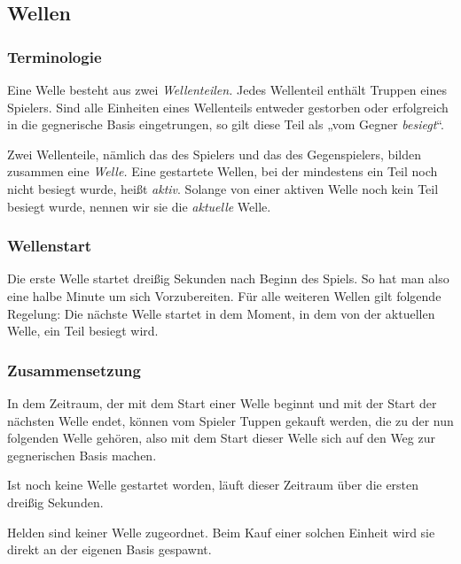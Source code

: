 \subsection{Wellen}

\subsubsection{Terminologie}

Eine Welle besteht aus zwei \emph{Wellenteilen.} Jedes Wellenteil enthält
Truppen eines Spielers.  Sind alle Einheiten eines Wellenteils entweder
gestorben oder erfolgreich in die gegnerische Basis eingetrungen, so gilt diese Teil als „vom Gegner \emph{besiegt}“.

Zwei Wellenteile, nämlich das des Spielers und das des Gegenspielers, bilden
zusammen eine \emph{Welle.} Eine gestartete Wellen, bei der mindestens ein Teil
noch nicht besiegt wurde, heißt \emph{aktiv}.
Solange von einer aktiven Welle noch kein Teil besiegt wurde, nennen wir sie die \emph{aktuelle} Welle.


\subsubsection{Wellenstart}

Die erste Welle startet dreißig Sekunden nach Beginn des Spiels. So hat man also eine halbe Minute um sich Vorzubereiten.
Für alle weiteren Wellen gilt folgende Regelung: Die nächste Welle startet in dem Moment, in dem von der aktuellen Welle, ein Teil besiegt wird.


\subsubsection{Zusammensetzung}

In dem Zeitraum, der mit dem Start einer Welle beginnt und mit der Start der
nächsten Welle endet, können vom Spieler Tuppen gekauft werden, die zu der nun
folgenden Welle gehören, also mit dem Start dieser Welle sich auf den Weg zur
gegnerischen Basis machen.

Ist noch keine Welle gestartet worden, läuft dieser Zeitraum über die ersten
dreißig Sekunden.

Helden sind keiner Welle zugeordnet. Beim Kauf einer solchen Einheit wird sie
direkt an der eigenen Basis gespawnt.
